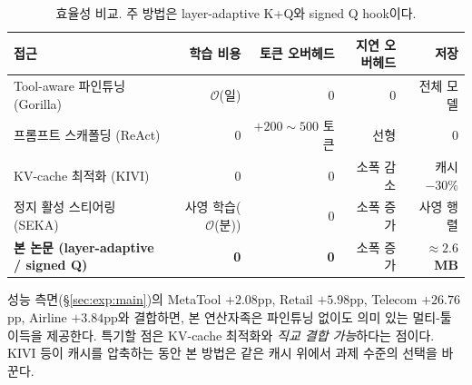 \begin{table}[t]
\centering
\caption{효율성 비교. 주 방법은 layer-adaptive K+Q와 signed Q hook이다.}
\label{tab:e-efficiency}
\small
\begin{tabularx}{\linewidth}{@{}Xrrrr@{}}
\toprule
접근 & 학습 비용 & 토큰 오버헤드 & 지연 오버헤드 & 저장 \\
\midrule
Tool-aware 파인튜닝 (Gorilla) & $\mathcal{O}$(일) & 0 & 0 & 전체 모델 \\
프롬프트 스캐폴딩 (ReAct) & 0 & $+200\sim 500$ 토큰 & 선형 & 0 \\
KV-cache 최적화 (KIVI) & 0 & 0 & 소폭 감소 & 캐시 $-30\%$ \\
정지 활성 스티어링 (SEKA) & 사영 학습($\mathcal{O}$(분)) & 0 & 소폭 증가 & 사영 행렬 \\
\textbf{본 논문 (layer-adaptive / signed Q)} & \textbf{0} & \textbf{0} & 소폭 증가 & $\boldsymbol{\approx 2.6}$ \textbf{MB} \\
\bottomrule
\end{tabularx}
\end{table}

성능 측면(\S\ref{sec:exp:main})의 MetaTool $+2.08$pp, Retail $+5.98$pp, Telecom $+26.76$pp, Airline $+3.84$pp와 결합하면, 본 연산자족은 파인튜닝 없이도 의미 있는 멀티-툴 이득을 제공한다. 특기할 점은 KV-cache 최적화와 \emph{직교 결합 가능}하다는 점이다. KIVI 등이 캐시를 압축하는 동안 본 방법은 같은 캐시 위에서 과제 수준의 선택을 바꾼다.
